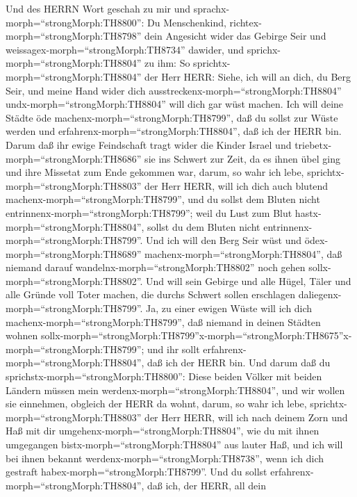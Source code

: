  Und des HERRN Wort geschah zu mir und
sprachx-morph=``strongMorph:TH8800'':  Du Menschenkind,
richtex-morph=``strongMorph:TH8798'' dein Angesicht wider das Gebirge
Seir und weissagex-morph=``strongMorph:TH8734'' dawider, 
und sprichx-morph=``strongMorph:TH8804'' zu ihm: So
sprichtx-morph=``strongMorph:TH8804'' der Herr HERR: Siehe, ich will an
dich, du Berg Seir, und meine Hand wider dich
ausstreckenx-morph=``strongMorph:TH8804''
undx-morph=``strongMorph:TH8804'' will dich gar wüst machen.
 Ich will deine Städte öde
machenx-morph=``strongMorph:TH8799'', daß du sollst zur Wüste werden und
erfahrenx-morph=``strongMorph:TH8804'', daß ich der HERR bin.
 Darum daß ihr ewige Feindschaft tragt wider die Kinder
Israel und triebetx-morph=``strongMorph:TH8686'' sie ins Schwert zur
Zeit, da es ihnen übel ging und ihre Missetat zum Ende gekommen war,
 darum, so wahr ich lebe,
sprichtx-morph=``strongMorph:TH8803'' der Herr HERR, will ich dich auch
blutend machenx-morph=``strongMorph:TH8799'', und du sollst dem Bluten
nicht entrinnenx-morph=``strongMorph:TH8799''; weil du Lust zum Blut
hastx-morph=``strongMorph:TH8804'', sollst du dem Bluten nicht
entrinnenx-morph=``strongMorph:TH8799''.  Und ich will den
Berg Seir wüst und ödex-morph=``strongMorph:TH8689''
machenx-morph=``strongMorph:TH8804'', daß niemand darauf
wandelnx-morph=``strongMorph:TH8802'' noch gehen
sollx-morph=``strongMorph:TH8802''.  Und will sein Gebirge
und alle Hügel, Täler und alle Gründe voll Toter machen, die durchs
Schwert sollen erschlagen daliegenx-morph=``strongMorph:TH8799''.
 Ja, zu einer ewigen Wüste will ich dich
machenx-morph=``strongMorph:TH8799'', daß niemand in deinen Städten
wohnen
sollx-morph=``strongMorph:TH8799''\textbar x-morph=``strongMorph:TH8675''x-morph=``strongMorph:TH8799'';
und ihr sollt erfahrenx-morph=``strongMorph:TH8804'', daß ich der HERR
bin.  Und darum daß du
sprichstx-morph=``strongMorph:TH8800'': Diese beiden Völker mit beiden
Ländern müssen mein werdenx-morph=``strongMorph:TH8804'', und wir wollen
sie einnehmen, obgleich der HERR da wohnt,  darum, so wahr
ich lebe, sprichtx-morph=``strongMorph:TH8803'' der Herr HERR, will ich
nach deinem Zorn und Haß mit dir umgehenx-morph=``strongMorph:TH8804'',
wie du mit ihnen umgegangen bistx-morph=``strongMorph:TH8804'' aus
lauter Haß, und ich will bei ihnen bekannt
werdenx-morph=``strongMorph:TH8738'', wenn ich dich gestraft
habex-morph=``strongMorph:TH8799''.  Und du sollst
erfahrenx-morph=``strongMorph:TH8804'', daß ich, der HERR, all dein
